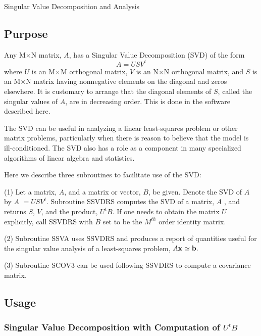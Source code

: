 \documentclass[twoside]{MATH77}
\begin{document}
 Singular Value Decomposition and Analysis


\subsection{Purpose}

Any M$\times $N matrix, $A$, has a Singular Value Decomposition (SVD) of the
form
\begin{equation*}
A = USV^t
\end{equation*}
where $U$ is an M$\times $M orthogonal matrix, $V$ is an N$\times $N
orthogonal matrix, and $S$ is an M$\times $N matrix having nonnegative
elements on the diagonal and zeros elsewhere. It is customary to arrange
that the diagonal elements of $S$, called the singular values of $A$, are in
decreasing order. This is done in the software described here.

The SVD can be useful in analyzing a linear least-squares problem or other
matrix problems, particularly when there is reason to believe that the model
is ill-conditioned. The SVD also has a role as a component in many
specialized algorithms of linear algebra and statistics.

Here we describe three subroutines to facilitate use of the SVD:

(1) Let a matrix, $A$, and a matrix or vector, $B$, be given. Denote the SVD
of $A$ by $A$ $= USV^t$. Subroutine SSVDRS computes the SVD of a matrix, $A$%
, and returns $S$, $V$, and the product, $U^tB$. If one needs to obtain the
matrix $U$ explicitly, call SSVDRS with $B$ set to be the $M^{th}$ order
identity matrix.

(2) Subroutine SSVA uses SSVDRS and produces a report of quantities useful
for the singular value analysis of a least-squares problem, $A{\bf x} \simeq
{\bf b}.$

(3) Subroutine SCOV3 can be used following SSVDRS to compute a covariance
matrix.

\subsection{Usage}

\subsubsection{Singular Value Decomposition with Computation of $U^tB$}
\end{document}
